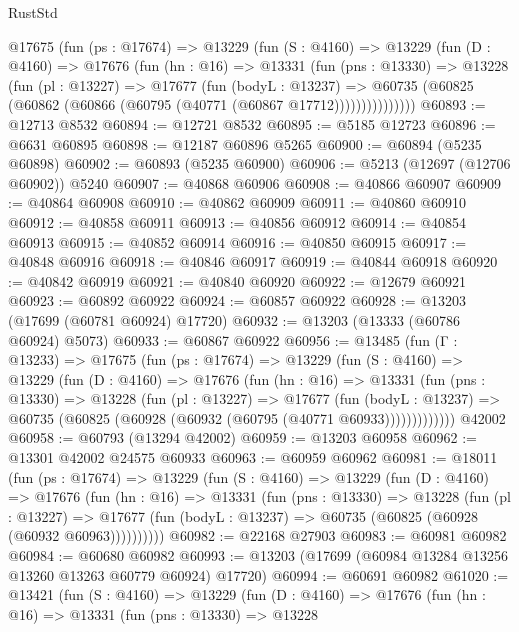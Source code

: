 \begin{lexlean}{RustStd}
\begin{coremodule}
      @17675
        (fun (ps : @17674) =>
        @13229
          (fun (S : @4160) =>
          @13229
            (fun (D : @4160) =>
            @17676
              (fun (hn : @16) =>
              @13331
                (fun (pns : @13330) =>
                @13228
                  (fun (pl : @13227) =>
                  @17677
                    (fun (bodyL : @13237) =>
                    @60735 (@60825 (@60862 (@60866 (@60795 (@40771 (@60867 @17712)))))))))))))))
@60893 := @12713 @8532
@60894 := @12721 @8532
@60895 := @5185 @12723
@60896 := @6631 @60895
@60898 := @12187 @60896 @5265
@60900 := @60894 (@5235 @60898)
@60902 := @60893 (@5235 @60900)
@60906 := @5213 (@12697 (@12706 @60902)) @5240
@60907 := @40868 @60906
@60908 := @40866 @60907
@60909 := @40864 @60908
@60910 := @40862 @60909
@60911 := @40860 @60910
@60912 := @40858 @60911
@60913 := @40856 @60912
@60914 := @40854 @60913
@60915 := @40852 @60914
@60916 := @40850 @60915
@60917 := @40848 @60916
@60918 := @40846 @60917
@60919 := @40844 @60918
@60920 := @40842 @60919
@60921 := @40840 @60920
@60922 := @12679 @60921
@60923 := @60892 @60922
@60924 := @60857 @60922
@60928 := @13203 (@17699 (@60781 @60924) @17720)
@60932 := @13203 (@13333 (@60786 @60924) @5073)
@60933 := @60867 @60922
@60956 := @13485
    (fun (Γ : @13233) =>
    @17675
      (fun (ps : @17674) =>
      @13229
        (fun (S : @4160) =>
        @13229
          (fun (D : @4160) =>
          @17676
            (fun (hn : @16) =>
            @13331
              (fun (pns : @13330) =>
              @13228
                (fun (pl : @13227) =>
                @17677
                  (fun (bodyL : @13237) =>
                  @60735 (@60825 (@60928 (@60932 (@60795 (@40771 @60933)))))))))))))
    @42002
@60958 := @60793 (@13294 @42002)
@60959 := @13203 @60958
@60962 := @13301 @42002 @24575 @60933
@60963 := @60959 @60962
@60981 := @18011
    (fun (ps : @17674) =>
    @13229
      (fun (S : @4160) =>
      @13229
        (fun (D : @4160) =>
        @17676
          (fun (hn : @16) =>
          @13331
            (fun (pns : @13330) =>
            @13228
              (fun (pl : @13227) =>
              @17677 (fun (bodyL : @13237) => @60735 (@60825 (@60928 (@60932 @60963))))))))))
@60982 := @22168 @27903
@60983 := @60981 @60982
@60984 := @60680 @60982
@60993 := @13203 (@17699 (@60984 @13284 @13256 @13260 @13263 @60779 @60924) @17720)
@60994 := @60691 @60982
@61020 := @13421
    (fun (S : @4160) =>
    @13229
      (fun (D : @4160) =>
      @17676
        (fun (hn : @16) =>
        @13331
          (fun (pns : @13330) =>
          @13228

\end{coremodule}
\end{lexlean}
